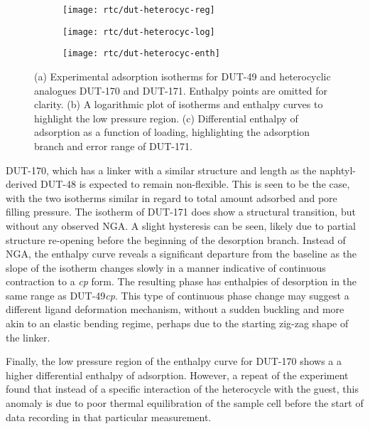 \begin{figure}[htb]
    \centering
    \begin{subfigure}{0.33\linewidth}
        \texttt{[image: rtc/dut-heterocyc-reg]}%
        \caption{}\label{dut:fgr:dut-heterocyc-reg}
    \end{subfigure}%
    \begin{subfigure}{0.33\linewidth}
        \texttt{[image: rtc/dut-heterocyc-log]}%
        \caption{}\label{dut:fgr:dut-heterocyc-log}
    \end{subfigure}%
    \begin{subfigure}{0.33\linewidth}
        \texttt{[image: rtc/dut-heterocyc-enth]}%
        \caption{}\label{dut:fgr:dut-heterocyc-enth}
    \end{subfigure}%
    \caption{(a) Experimental adsorption isotherms for DUT-49 and 
    heterocyclic analogues DUT-170 and DUT-171. 
    Enthalpy points are omitted for clarity. 
    (b) A logarithmic plot of isotherms and enthalpy curves
    to highlight the low pressure region. 
    (c) Differential enthalpy of adsorption as a function of loading, highlighting the 
    adsorption branch and error range of DUT-171.}%
    \label{dut:fgr:dut-heterocyc}
\end{figure}

DUT-170, which has a linker with a similar structure and length as
the naphtyl-derived DUT-48 is expected to remain non-flexible.
This is seen to be the case, with the two isotherms similar in 
regard to total amount adsorbed and pore filling pressure. 
The isotherm of DUT-171 does show a structural transition, 
but without any observed NGA. A slight hysteresis can be seen,
likely due to partial structure re-opening before the beginning 
of the desorption branch. Instead of NGA, the enthalpy curve 
reveals a significant departure from the baseline as the 
slope of the isotherm changes slowly in a manner indicative
of continuous contraction to a \textit{cp} form. The resulting phase 
has enthalpies of desorption in the same range as DUT-49\textit{cp}.
This type of continuous phase change may suggest a different 
ligand deformation mechanism, without a sudden buckling and 
more akin to an elastic bending regime, perhaps due to the 
starting zig-zag shape of the linker.

Finally, the low pressure region of the enthalpy curve for 
DUT-170 shows a a higher differential enthalpy of adsorption.
However, a repeat of the experiment found that instead of 
a specific interaction of the heterocycle with the guest,
this anomaly is due to poor thermal equilibration of the 
sample cell before the start of data recording in that 
particular measurement.

